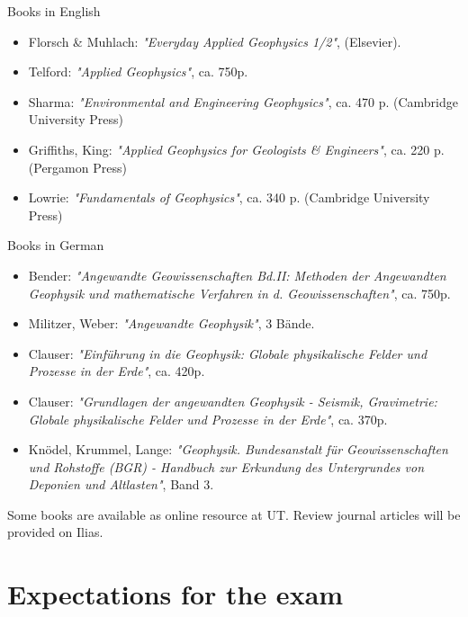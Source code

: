 \documentclass[letterpaper]{inzane_syllabus} %
\begin{document}
{\color{myCOLOR} Books in English}\\
\begin{itemize} 
\item Florsch \& Muhlach: \textit{"Everyday Applied Geophysics 1/2"}, (Elsevier).
    
\item Telford: \textit{"Applied Geophysics"}, ca. 750p. 

\item Sharma: \textit{"Environmental and Engineering Geophysics"}, ca. 470 p. (Cambridge University Press)

\item Griffiths, King: \textit{"Applied Geophysics for Geologists \& Engineers"}, ca. 220 p. (Pergamon Press)

\item Lowrie: \textit{"Fundamentals of Geophysics"}, ca. 340 p. (Cambridge University Press)
\end{itemize}
{\color{myCOLOR} Books in German}\\
\begin{itemize}
\item Bender: \textit{"Angewandte Geowissenschaften Bd.II: Methoden der Angewandten Geophysik und mathematische Verfahren in d. Geowissenschaften"}, ca. 750p. 

\item Militzer, Weber: \textit{"Angewandte Geophysik"}, 3 Bände. 

\item Clauser: \textit{"Einführung in die Geophysik: Globale physikalische Felder und Prozesse in der Erde"}, ca. 420p. 

\item Clauser: \textit{"Grundlagen der angewandten Geophysik - Seismik, Gravimetrie: Globale physikalische Felder und Prozesse in der Erde"}, ca. 370p. 

\item Knödel, Krummel, Lange: \textit{"Geophysik. Bundesanstalt für Geowissenschaften und Rohstoffe (BGR) - Handbuch zur Erkundung des Untergrundes von Deponien und Altlasten"}, Band 3. \\
\end{itemize}

Some books are available as online resource at UT. Review journal articles will be provided on Ilias. 





\section{Expectations for the exam}
\end{document}
